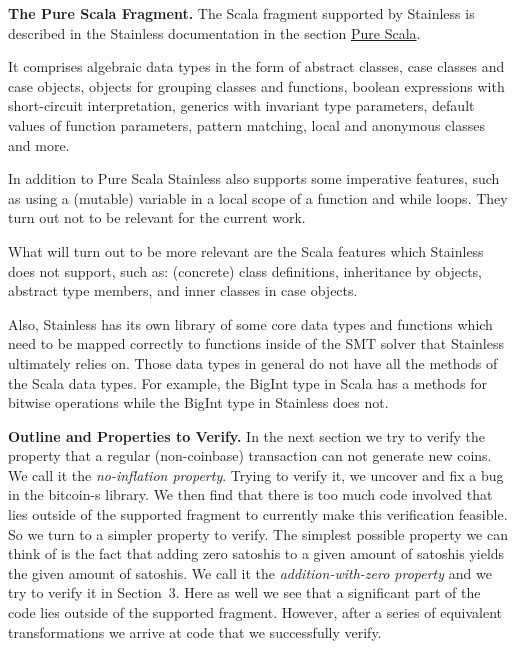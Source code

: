 \documentclass[runningheads]{llncs}
\renewcommand{\paragraph}{\textbf}%
\begin{document}
\paragraph{The Pure Scala Fragment.} The Scala fragment supported by
Stainless is described in the Stainless documentation
\cite{Stainless:documentation} in the section
\href{https://epfl-lara.github.io/stainless/purescala.html}{Pure
  Scala}.

It comprises algebraic data types in the form of abstract classes,
case classes and case objects, objects for grouping classes and
functions, boolean expressions with short-circuit interpretation,
generics with invariant type parameters, default values of function
parameters, pattern matching, local and anonymous classes and more.
  
In addition to Pure Scala Stainless also supports some imperative
features, such as using a (mutable) variable in a local scope of a
function and while loops. They turn out not to be relevant for the
current work.

What will turn out to be more relevant are the Scala features which
Stainless does not support, such as: (concrete) class definitions,
inheritance by objects, abstract type members, and inner classes in
case objects.

Also, Stainless has its own library of some core data types and
functions which need to be mapped correctly to functions inside of the
SMT solver that Stainless ultimately relies on. Those data types in
general do not have all the methods of the Scala data types. For
example, the BigInt type in Scala has a methods for bitwise operations
while the BigInt type in Stainless does not.

\paragraph{Outline and Properties to Verify.} In the next section we
try to verify the property that a regular (non-coinbase) transaction
can not generate new coins. We call it the \emph{no-inflation
  property}. Trying to verify it, we uncover and fix a bug in the
bitcoin-s library. We then find that there is too much code involved
that lies outside of the supported fragment to currently make this
verification feasible. So we turn to a simpler property to verify. The
simplest possible property we can think of is the fact that adding
zero satoshis to a given amount of satoshis yields the given amount of
satoshis. We call it the \emph{addition-with-zero property} and we try
to verify it in Section~3. Here as well we see that a significant part
of the code lies outside of the supported fragment. However, after a
series of equivalent transformations we arrive at code that we
successfully verify.
\end{document}
